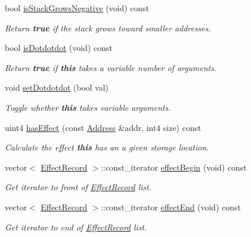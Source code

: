 \begin{DoxyCompactItemize}
bool \mbox{\hyperlink{class_func_proto_a2cb0c5a60d2cfd70462d8e9f75aa9819}{is\+Stack\+Grows\+Negative}} (void) const
\begin{DoxyCompactList}\small\item\em Return {\bfseries{true}} if the stack grows toward smaller addresses. \end{DoxyCompactList}\item 
bool \mbox{\hyperlink{class_func_proto_a4f4e0521c603ad73b2d73ad96f8cb954}{is\+Dotdotdot}} (void) const
\begin{DoxyCompactList}\small\item\em Return {\bfseries{true}} if {\bfseries{this}} takes a variable number of arguments. \end{DoxyCompactList}\item 
void \mbox{\hyperlink{class_func_proto_a6d237b521223b740d5d052b68966b556}{set\+Dotdotdot}} (bool val)
\begin{DoxyCompactList}\small\item\em Toggle whether {\bfseries{this}} takes variable arguments. \end{DoxyCompactList}\item 
uint4 \mbox{\hyperlink{class_func_proto_a906c0e176919bd0ced34e337445c2bf7}{has\+Effect}} (const \mbox{\hyperlink{class_address}{Address}} \&addr, int4 size) const
\begin{DoxyCompactList}\small\item\em Calculate the effect {\bfseries{this}} has an a given storage location. \end{DoxyCompactList}\item 
vector$<$ \mbox{\hyperlink{class_effect_record}{Effect\+Record}} $>$\+::const\+\_\+iterator \mbox{\hyperlink{class_func_proto_a802de184a6ac675b8f4bb4c4cb47a194}{effect\+Begin}} (void) const
\begin{DoxyCompactList}\small\item\em Get iterator to front of \mbox{\hyperlink{class_effect_record}{Effect\+Record}} list. \end{DoxyCompactList}\item 
vector$<$ \mbox{\hyperlink{class_effect_record}{Effect\+Record}} $>$\+::const\+\_\+iterator \mbox{\hyperlink{class_func_proto_a75adeed5dd962662f85c69b6104a8d07}{effect\+End}} (void) const
\begin{DoxyCompactList}\small\item\em Get iterator to end of \mbox{\hyperlink{class_effect_record}{Effect\+Record}} list. \end{DoxyCompactList}\item 

\end{DoxyCompactItemize}
